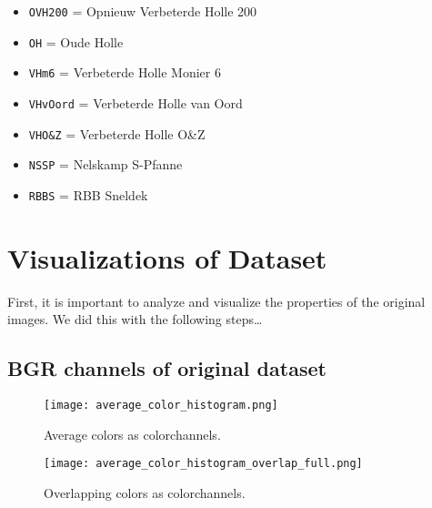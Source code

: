 \begin{fullwidth}
\begin{itemize}
\begin{itemize}
			\item \verb|OVH200| = Opnieuw Verbeterde Holle 200
			\item \verb|OH| = Oude Holle
			\item \verb|VHm6| = Verbeterde Holle Monier 6
			\item \verb|VHvOord| = Verbeterde Holle van Oord
			\item \verb|VHO&Z| = Verbeterde Holle O\&Z
			\item \verb|NSSP| = Nelskamp S-Pfanne
			\item \verb|RBBS| = RBB Sneldek
		\end{itemize}
	\end{itemize} 
\end{fullwidth}

\newpage
\section{Visualizations of Dataset}
First, it is important to analyze and visualize the properties of the original images. 
We did this with the following steps\dots

\subsection{BGR channels of original dataset}

\begin{figure}[H] %
	\texttt{[image: average\_color\_histogram.png]}
	\caption{Average colors as colorchannels.}
	\label{fig:average_color_histogram} %
\end{figure}

\begin{figure}[H] %
	\texttt{[image: average\_color\_histogram\_overlap\_full.png]}
	\caption{Overlapping colors as colorchannels.}
	\label{fig:average_color_histogram_overlap_full} %
\end{figure}

